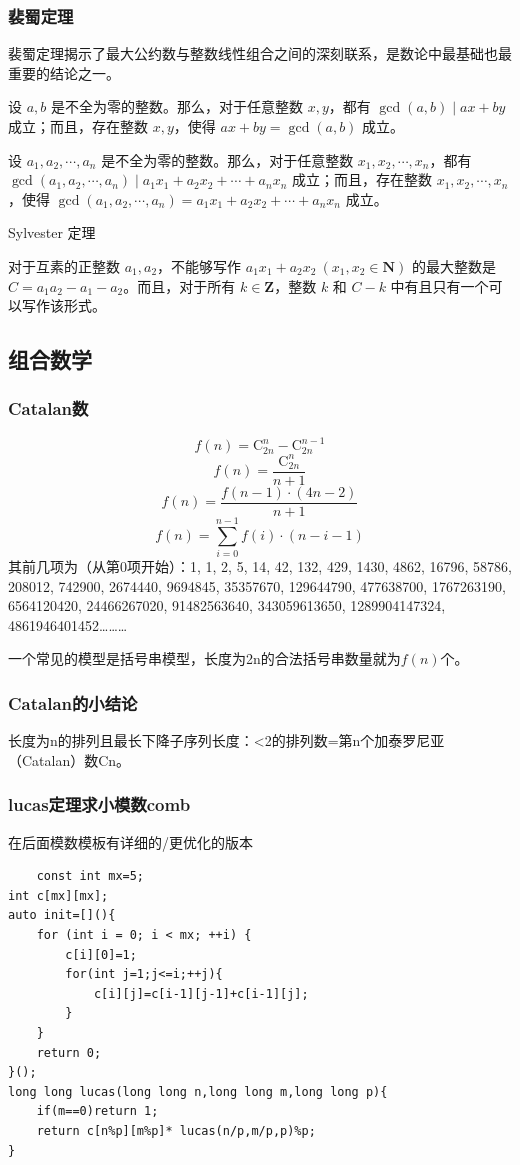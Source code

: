 \documentclass[UTF8,twoside]{ctexart}
\begin{document}
\subsubsection{裴蜀定理}
裴蜀定理揭示了最大公约数与整数线性组合之间的深刻联系，是数论中最基础也最重要的结论之一。

设 $a,b$ 是不全为零的整数。那么，对于任意整数 $x,y$，都有 $\gcd(a,b)\mid ax+by$ 成立；而且，存在整数 $x,y$，使得 $ax+by=\gcd(a,b)$ 成立。

设 $a_1,a_2,\cdots,a_n$ 是不全为零的整数。那么，对于任意整数 $x_1,x_2,\cdots,x_n$，都有 $\gcd(a_1,a_2,\cdots,a_n)\mid a_1x_1+a_2x_2+\cdots+a_nx_n$ 成立；而且，存在整数 $x_1,x_2,\cdots,x_n$，使得 $\gcd(a_1,a_2,\cdots,a_n)=a_1x_1+a_2x_2+\cdots+a_nx_n$ 成立。

Sylvester 定理

对于互素的正整数 $a_1,a_2$，不能够写作 $a_1x_1+a_2x_2~(x_1,x_2\in\mathbf N)$ 的最大整数是 $C = a_1a_2 - a_1 - a_2$。而且，对于所有 $k\in\mathbf Z$，整数 $k$ 和 $C-k$ 中有且只有一个可以写作该形式。
\subsection{组合数学}
\subsubsection{Catalan数}
\[
f(n)=\mathrm{C}_{2n}^{n}-\mathrm{C}_{2n}^{n-1}
\]
\[
f(n)=\frac{\mathrm{C}_{2n}^{n}}{n+1}
\]
\[
f(n)=\frac{f(n-1)\cdot (4n-2)}{n+1}
\]
\[
f(n)=\sum_{i=0}^{n-1}f(i)\cdot(n-i-1)
\]
其前几项为（从第0项开始）：1, 1, 2, 5, 14, 42, 132, 429, 1430, 4862, 16796, 58786, 208012, 742900, 2674440, 9694845, 35357670, 129644790, 477638700, 1767263190, 6564120420, 24466267020, 91482563640, 343059613650, 1289904147324, 4861946401452………

一个常见的模型是括号串模型，长度为2n的合法括号串数量就为$f(n)$个。
\subsubsection{Catalan的小结论}
长度为n的排列且最长下降子序列长度：<2的排列数=第n个加泰罗尼亚（Catalan）数Cn。
\subsubsection{lucas定理求小模数comb}
在后面模数模板有详细的/更优化的版本
\begin{lstlisting}
    const int mx=5;
int c[mx][mx];
auto init=[](){
    for (int i = 0; i < mx; ++i) {
        c[i][0]=1;
        for(int j=1;j<=i;++j){
            c[i][j]=c[i-1][j-1]+c[i-1][j];
        }
    }
    return 0;
}();
long long lucas(long long n,long long m,long long p){
    if(m==0)return 1;
    return c[n%p][m%p]* lucas(n/p,m/p,p)%p;
}
\end{lstlisting}
\end{document}
